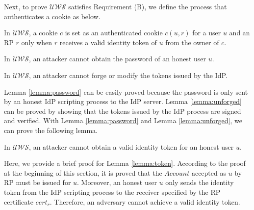Next, to prove $\mathcal{UWS}$ satisfies Requirement (B), we define the process that authenticates a cookie as below.
\vspace{-\topsep}
\begin{definition}
In $\mathcal{UWS}$, a cookie $c$ is set as an authenticated cookie $c(u,r)$ for a user $u$ and an RP $r$ only when $r$ receives a valid identity token of $u$ from the owner of $c$.
\label{def:cookie}
\end{definition}
\vspace{-\topsep}
\vspace{-\topsep}
\begin{lemma}
In $\mathcal{UWS}$, an attacker cannot obtain the password of an honest user $u$.
\label{lemma:password}
\end{lemma}
\vspace{-\topsep}
\vspace{-\topsep}
\begin{lemma}
In $\mathcal{UWS}$, an attacker cannot forge or modify the tokens issued by the IdP.
\label{lemma:unforged}
\end{lemma}
\vspace{-\topsep}
Lemma \ref{lemma:password} can be easily proved because the password is only sent by an honest IdP scripting process to the IdP server. Lemma \ref{lemma:unforged} can be proved by showing that the tokens issued by the IdP process are signed and verified. With Lemma \ref{lemma:password} and Lemma \ref{lemma:unforged}, we can prove the following lemma.
\vspace{-\topsep}
\begin{lemma}
In $\mathcal{UWS}$, an attacker cannot obtain a valid identity token for an honest user $u$.
\label{lemma:token}
\end{lemma}
\vspace{-\topsep}
Here, we provide a brief proof for Lemma \ref{lemma:token}.
According to the proof at the beginning of this section, it is proved that the $Account$ accepted as $u$ by RP must be issued for $u$. Moreover,  an honest user $u$ only sends the identity token from the IdP scripting process to the receiver specified by the RP certificate $cert_r$.  Therefore, an adversary cannot achieve a valid identity token.
